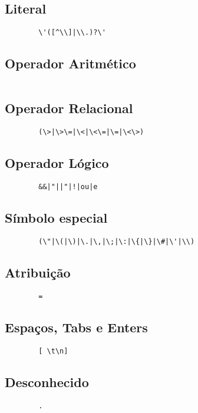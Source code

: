 \documentclass[a4paper,10pt]{article}
\begin{document}
	\subsection{Literal}
		\begin{verbatim}
		\'([^\\]|\\.)?\'
		\end{verbatim}

	\subsection{Operador Aritmético}
		\begin{verbatim}
		\end{verbatim}

	\subsection{Operador Relacional}
		\begin{verbatim}
		(\>|\>\=|\<|\<\=|\=|\<\>)
		\end{verbatim}

	\subsection{Operador Lógico}
		\begin{verbatim}
		&&|"||"|!|ou|e
		\end{verbatim}

	\subsection{Símbolo especial}
		\begin{verbatim}
		(\"|\(|\)|\.|\,|\;|\:|\{|\}|\#|\'|\\)
		\end{verbatim}

	\subsection{Atribuição}
		\begin{verbatim}
		=
		\end{verbatim}

	\subsection{Espa\c cos, Tabs e Enters}
		\begin{verbatim}
		[ \t\n]
		\end{verbatim}

	\subsection{Desconhecido}
		\begin{verbatim}
		.
		\end{verbatim}
\end{document}

